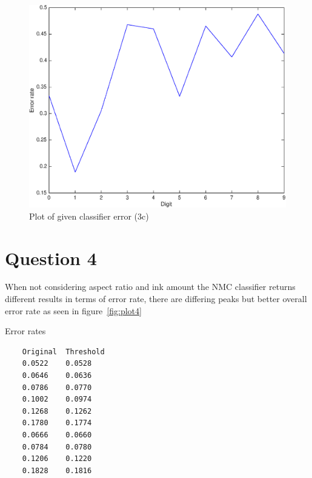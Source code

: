 \documentclass{article}
\begin{document}
\begin{figure}
\centering
\includegraphics[width=\textwidth]{3c}
\caption{Plot of given classifier error (3c)}
\label{fig:3c}
\end{figure}

\pagebreak

\section*{Question 4}


When not considering aspect ratio and ink amount the NMC classifier returns different results in terms of error rate, there are differing peaks but better overall error rate as seen in figure~\ref{fig:plot4}

Error rates

\begin{lstlisting}
    Original  Threshold
    0.0522    0.0528
    0.0646    0.0636
    0.0786    0.0770
    0.1002    0.0974
    0.1268    0.1262
    0.1780    0.1774
    0.0666    0.0660
    0.0784    0.0780
    0.1206    0.1220
    0.1828    0.1816
\end{lstlisting}
\end{document}
